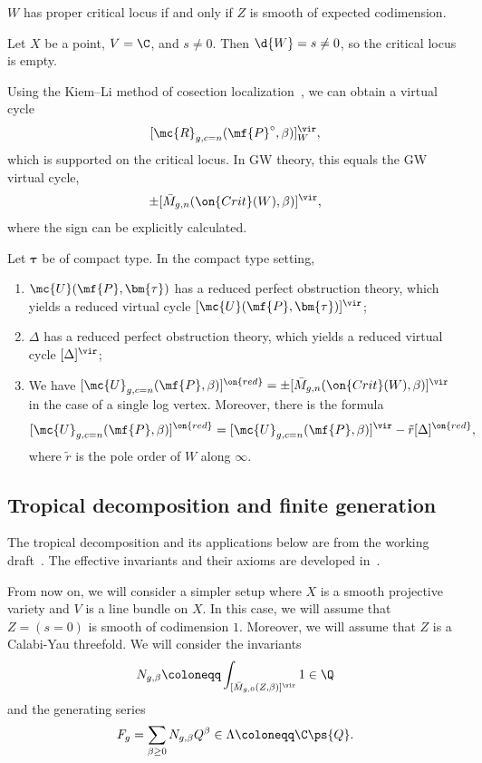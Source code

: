 \begin{lem}
    \(W\) has proper critical locus if and only if \(Z\) is smooth of expected codimension.
\end{lem}

\begin{exm}
    Let \(X\) be a point, \(V = \C\), and \(s \neq 0\). Then \(\d{W} = s \neq 0\), so the critical locus is empty.
\end{exm}

Using the Kiem--Li method of cosection localization~\cite{KiemLi2013}, we can obtain a virtual cycle
\[ [\mc{R}_{g, c=n}(\mf{P}^{\circ}, \beta)]_W^{\vir}, \]
which is supported on the critical locus. In GW theory, this equals the GW virtual cycle, 
\[ \pm [\bar{M}_{g,n}(\on{Crit}(W), \beta)]^{\vir}, \]
where the sign can be explicitly calculated.

\begin{thm}
    Let \(\bm{\tau}\) be of compact type. In the compact type setting, 
    \begin{enumerate}
        \item \(\mc{U}(\mf{P}, \bm{\tau})\) has a reduced perfect obstruction theory, which yields a reduced virtual cycle \([\mc{U}(\mf{P}, \bm{\tau})]^{\vir}\);
        \item \(\Delta\) has a reduced perfect obstruction theory, which yields a reduced virtual cycle \([\Delta]^{\vir}\);
        \item We have \([\mc{U}_{g, c=n}(\mf{P}, \beta)]^{\on{red}} = \pm [\bar{M}_{g,n}(\on{Crit}(W), \beta)]^{\vir}\) in the case of a single log vertex. Moreover, there is the formula
            \[ [\mc{U}_{g, c=n}(\mf{P}, \beta)]^{\on{red}} = [\mc{U}_{g, c=n}(\mf{P}, \beta)]^{\vir} - \tilde{r} [\Delta]^{\on{red}}, \]
            where \(\tilde{r}\) is the pole order of \(W\) along \(\infty\).
    \end{enumerate}
\end{thm}

\subsection{Tropical decomposition and finite generation}%
\label{sub:Tropical decomposition and finite generation}

The tropical decomposition and its applications below are from the working draft~\cite{CJRtropical2025}. The effective invariants and their axioms are developed in~\cite{CJRpunctured}.

From now on, we will consider a simpler setup where \(X\) is a smooth projective variety and \(V\) is a line bundle on \(X\). In this case, we will assume that \(Z = (s = 0)\) is smooth of codimension \(1\). Moreover, we will assume that \(Z\) is a Calabi-Yau threefold. We will consider the invariants
\[ N_{g, \beta} \coloneqq \int_{[\bar{M}_{g,0}(Z, \beta)]^{\vir}} 1 \in \Q \]
and the generating series
\[ F_g = \sum_{\beta \geq 0} N_{g, \beta} Q^{\beta} \in \Lambda \coloneqq \C \ps{Q}. \]

